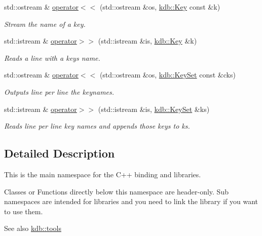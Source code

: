 \begin{DoxyCompactItemize}
std\+::ostream \& \hyperlink{namespacekdb_ac004b5ba79154cbba02d5e5d83337e47}{operator$<$$<$} (std\+::ostream \&os, \hyperlink{classkdb_1_1Key}{kdb\+::\+Key} const \&k)
\begin{DoxyCompactList}\small\item\em Stream the name of a key. \end{DoxyCompactList}\item 
std\+::istream \& \hyperlink{namespacekdb_a66342865d6cdbb19075f52d92e7a61b1}{operator$>$$>$} (std\+::istream \&is, \hyperlink{classkdb_1_1Key}{kdb\+::\+Key} \&k)
\begin{DoxyCompactList}\small\item\em Reads a line with a keys name. \end{DoxyCompactList}\item 
std\+::ostream \& \hyperlink{namespacekdb_afd28754a48d420d2f2a41c5d8242f3fb}{operator$<$$<$} (std\+::ostream \&os, \hyperlink{classkdb_1_1KeySet}{kdb\+::\+Key\+Set} const \&cks)
\begin{DoxyCompactList}\small\item\em Outputs line per line the keynames. \end{DoxyCompactList}\item 
std\+::istream \& \hyperlink{namespacekdb_ac4479a9f39ed65ffd251161bcaf8ea89}{operator$>$$>$} (std\+::istream \&is, \hyperlink{classkdb_1_1KeySet}{kdb\+::\+Key\+Set} \&ks)
\begin{DoxyCompactList}\small\item\em Reads line per line key names and appends those keys to ks. \end{DoxyCompactList}\end{DoxyCompactItemize}


\subsection{Detailed Description}
This is the main namespace for the C++ binding and libraries. 

Classes or Functions directly below this namespace are header-\/only. Sub namespaces are intended for libraries and you need to link the library if you want to use them.
\begin{DoxyItemize}
\item \begin{DoxySeeAlso}{See also}
\hyperlink{namespacekdb_1_1tools}{kdb\+::tools} 
\end{DoxySeeAlso}

\end{DoxyItemize}


